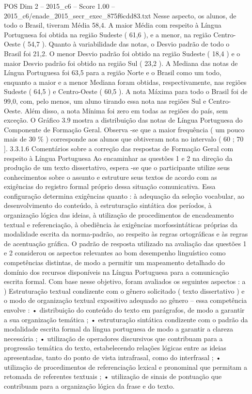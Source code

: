 \begin{textsample}{POS Dim 2 – 2015\_c6 – Score 1.00 – 2015\_c6/enade\_2015\_secr\_exec\_875f6cdd83.txt}
Nesse aspecto, os alunos, de todo o Brasil, tiveram Média 58,4.
A maior Média com respeito à Língua Portuguesa foi obtida na região Sudeste ( 61,6 ), e a menor, na região Centro-Oeste ( 54,7 ).
Quanto à variabilidade das notas, o Desvio padrão de todo o Brasil foi 21,2.
O menor Desvio padrão foi obtido na região Sudeste ( 18,4 ) e o maior Desvio padrão foi obtido na região Sul ( 23,2 ).
A Mediana das notas de Língua Portuguesa foi 63,5 para a região Norte e o Brasil como um todo, enquanto a maior e a menor Mediana foram obtidas, respectivamente, nas regiões Sudeste ( 64,5 ) e Centro-Oeste ( 60,5 ).
A nota Máxima para todo o Brasil foi de 99,0, com, pelo menos, um aluno tirando essa nota nas regiões Sul e Centro-Oeste.
Além disso, a nota Mínima foi zero em todas as regiões do país, sem exceção.
O Gráfico 3.9 mostra a distribuição das notas de Língua Portuguesa do Componente de Formação Geral.
Observa -se que a maior frequência ( um pouco mais de 30 \% ) corresponde aos alunos que obtiveram nota no intervalo ( 60 ; 70 ]. 3.3.1.6 Comentários sobre a correção das respostas de Formação Geral com respeito à Língua Portuguesa Ao encaminhar as questões 1 e 2 na direção da produção de um texto dissertativo, espera -se que o participante utilize seus conhecimentos sobre o assunto e estruture seus textos de acordo com as exigências do registro formal próprio dessa situação comunicativa.
Essa configuração determina exigências quanto : à adequação da seleção vocabular, ao desenvolvimento do conteúdo, à estruturação sintática dos períodos, à organização lógica das ideias, à utilização de procedimentos de encadeamento textual e referenciação, à obediência às exigências morfossintáticas próprias da modalidade escrita da norma-padrão, ao respeito às regras ortográficas e às regras de acentuação gráfica.
O padrão de resposta utilizado na avaliação das questões 1 e 2 considerou os aspectos relevantes ao bom desempenho linguístico como competências distintas, de modo a permitir um mapeamento detalhado do domínio dos recursos disponíveis na Língua Portuguesa para a comunicação escrita formal.
Com base nesse objetivo, foram avaliados os seguintes aspectos : a ) Estruturação textual condizente com o gênero solicitado ( texto dissertativo ) e o modo de organização textual expositivo adequado ao gênero – essa competência envolve : • distribuição do conteúdo do texto em parágrafos, de modo a garantir a sua organização temática ; • estruturação sintática condizente com o padrão da modalidade escrita formal da língua portuguesa de modo a garantir a clareza necessária ; • utilização de operadores discursivos que contribuam para a progressão temática do texto, estabelecendo relações lógicas entre as ideias apresentadas, tanto do ponto de vista intrafrasal, como do interfrasal ; • utilização de procedimentos de referenciação lexical e pronominal que permitam a retomada de referentes textuais ; • utilização de sinais de pontuação que contribuam para a organização lógica da frase e do texto.

\end{textsample}
